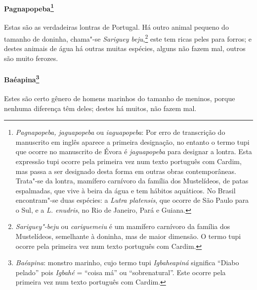 \paragraph{Pagnapopeba\footnote{ \textit{Pagnapopeba, jaguapopeba} ou
\textit{iaguapopeba}: Por erro de transcrição do manuscrito em inglês
aparece a primeira designação, no entanto o termo tupi que ocorre no
manuscrito de Évora é \textit{jaguapopeba} para designar a lontra. Esta
expressão tupi ocorre pela primeira vez num texto português com Cardim,
mas passa a ser designado desta forma em outras obras contemporâneas.
Trata"-se da lontra, mamífero carnívoro da família dos Mustelídeos, de
patas espalmadas, que vive à beira da água e tem hábitos aquáticos. No
Brasil encontram"-se duas espécies: a \textit{Lutra platensis}, que
ocorre de São Paulo para o Sul, e a \textit{L. enudris}, no Rio de
Janeiro, Pará e Guiana.}} Estas são as verdadeiras
lontras de Portugal. Há outro animal pequeno do tamanho de doninha,
chama"-se \textit{Sariguey beju},\footnote{ \textit{Sariguey"-beju} ou
\textit{cariguemeiu} é um mamífero carnívoro da família dos
Mustelídeos, semelhante à doninha, mas de maior dimensão. O termo tupi
ocorre pela primeira vez num texto português com Cardim.} este tem
ricas peles para forros; e destes animais de água há outras muitas
espécies, alguns não fazem mal, outros são muito ferozes.

\paragraph{Baéapina\footnote{ \textit{Baéapina}: monstro marinho, cujo
termo tupi \textit{Igbaheapiná} significa ``Diabo pelado'' pois
\textit{Igbahé} = ``coisa má'' ou ``sobrenatural''. Este ocorre pela
primeira vez num texto português com Cardim.}} Estes são
certo gênero de homens marinhos do tamanho de meninos, porque nenhuma
diferença têm deles; destes há muitos, não fazem mal.

